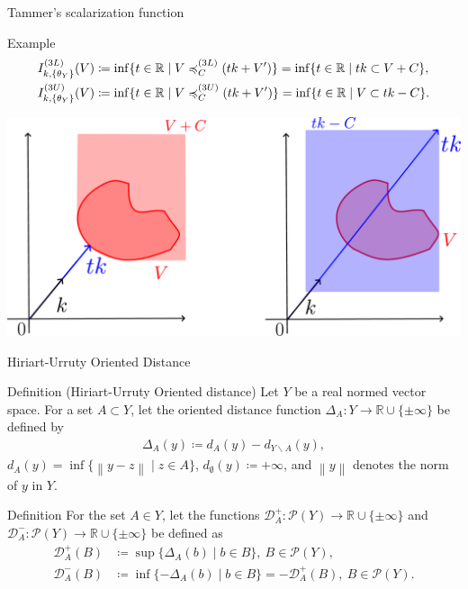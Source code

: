 \documentclass[aspectratio=169, dvipdfmx, 11pt]{beamer}
\newcommand{\RealNumberSet}{\mathbb{R}}
\newcommand{\Norm}[1]{\left\lVert {#1} \right\rVert} %
\begin{document}
\begin{frame}{Tammer's scalarization function}
  \begin{exampleblock}{Example}
    \begin{align}
      I^{(3L)}_{k, \{\theta_{Y}\}} (V) & \coloneq \inf\{ t \in \RealNumberSet \mid V \preccurlyeq_{C}^{(3L)} (tk + V') \}
      = \inf\{ t \in \RealNumberSet \mid tk \subset V + C \}, \notag                                                      \\
      I^{(3U)}_{k, \{\theta_{Y}\}} (V) & \coloneq \inf\{ t \in \RealNumberSet \mid V \preccurlyeq_{C}^{(3U)} (tk + V') \}
      = \inf\{ t \in \RealNumberSet \mid V \subset tk - C \}. \notag
    \end{align}
  \end{exampleblock}
  \centering
  \includegraphics[keepaspectratio, scale=0.10]{figures/eps/tammar_scalarization_example.eps}
\end{frame}


\begin{frame}{Hiriart-Urruty Oriented Distance}
  \begin{block}{Definition (Hiriart-Urruty Oriented distance) \cite{xu2016new}}
    Let $Y$ be a real normed vector space. For a set $A \subset Y$, let the oriented distance function
    $\Delta_{A} \colon Y \to \RealNumberSet\cup\{\pm \infty\}$ be defined by
    \begin{align*}
      \Delta_{A}(y) \coloneq d_{A} (y) - d_{Y \backslash A}(y),
    \end{align*}
    $ d_{A} (y)= \inf\{\Norm{y - z} \mid z \in A\}$, $d_{\emptyset} (y) \coloneq + \infty$,
    and $\Norm{y}$ denotes the norm of $y$ in $Y$.
  \end{block}

  \begin{block}{Definition \cite{xu2016new}}
    For the set $A \in Y$, let the functions $\mathcal{D}^{+}_{A} \colon \mathcal{P}(Y) \to \RealNumberSet \cup \{\pm \infty\}$
    and $\mathcal{D}^{-}_{A} \colon \mathcal{P}(Y) \to \RealNumberSet \cup \{\pm \infty\}$ be defined as
    \begin{align*}
      \mathcal{D}^{+}_{A}(B) & \coloneq \sup\{\Delta_{A}(b) \mid b \in B\},\: B \in \mathcal{P}(Y),                            \\
      \mathcal{D}^{-}_{A}(B) & \coloneq \inf\{-\Delta_{A}(b) \mid b \in B\} = -\mathcal{D}^{+}_{A}(B),\: B \in \mathcal{P}(Y).
    \end{align*}
  \end{block}
\end{frame}
\end{document}
